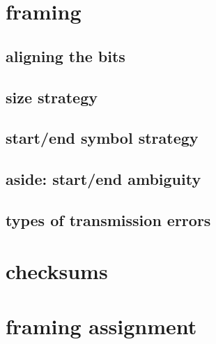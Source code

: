 
\section{framing}

\subsection{aligning the bits}



\subsection{size strategy}



\subsection{start/end symbol strategy}



\subsection{aside: start/end ambiguity}


\subsection{types of transmission errors}



\section{checksums}


\section{framing assignment}


